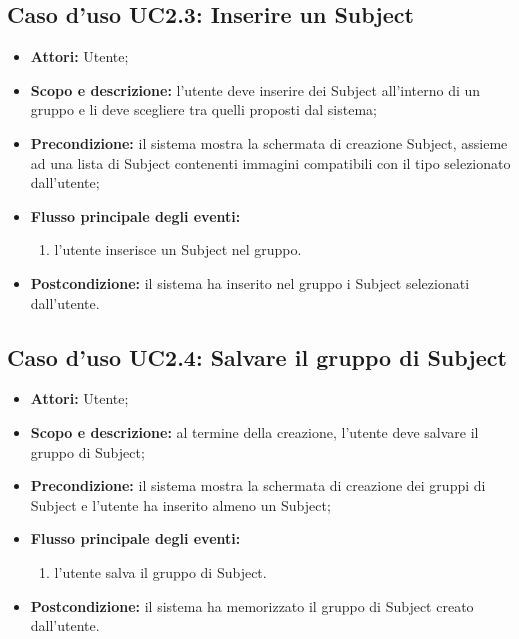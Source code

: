 \subsection{Caso d'uso UC2.3: Inserire un Subject}
\begin{itemize}
\item \textbf{Attori:} Utente;
\item \textbf{Scopo e descrizione:} l'utente deve inserire dei Subject\glossario{} all'interno di un gruppo e li deve scegliere tra quelli proposti dal sistema;
\item \textbf{Precondizione:} il sistema mostra la schermata di creazione Subject\glossario{}, assieme ad una lista di Subject\glossario{} contenenti immagini compatibili con il tipo selezionato dall'utente;
\item \textbf{Flusso principale degli eventi:}
\begin{enumerate}
\item l'utente inserisce un Subject\glossario{} nel gruppo.
\end{enumerate}
\item \textbf{Postcondizione:} il sistema ha inserito nel gruppo i Subject\glossario{} selezionati dall'utente.
\end{itemize}

\subsection{Caso d'uso UC2.4: Salvare il gruppo di Subject}
\begin{itemize}
\item \textbf{Attori:} Utente;
\item \textbf{Scopo e descrizione:} al termine della creazione, l'utente deve salvare il gruppo di Subject\glossario{};
\item \textbf{Precondizione:} il sistema mostra la schermata di creazione dei gruppi di Subject\glossario{} e l'utente ha inserito almeno un Subject\glossario{};
\item \textbf{Flusso principale degli eventi:}
\begin{enumerate}
\item l'utente salva il gruppo di Subject\glossario{}.
\end{enumerate}
\item \textbf{Postcondizione:} il sistema ha memorizzato il gruppo di Subject\glossario{} creato dall'utente.
\end{itemize}


